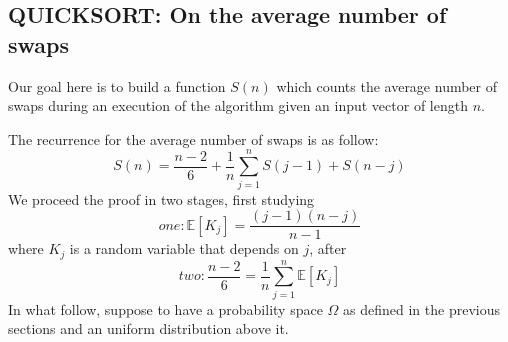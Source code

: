 \subsection{QUICKSORT: On the average number of swaps}
Our goal here is to build a function $S(n)$ which counts the average
number of swaps during an execution of the algorithm given an input
vector of length $n$.

The recurrence for the average number of swaps is as follow:
\begin{displaymath}
  S(n) =  \frac{n-2}{6} +  \frac{1}{n} \sum_{j=1}^{n}{S(j-1) + S(n-j)} 
\end{displaymath}
We proceed the proof in two stages, first studying
\begin{displaymath}
  one: \mathbb{E} \left[K_j \right]  = \frac{(j-1)(n-j)}{n-1} 
\end{displaymath}
where $K_j$ is a random variable that depends on $j$, after
\begin{displaymath}
  two: \frac{n-2}{6} = \frac{1}{n}\sum_{j=1}^{n}{
    \mathbb{E} \left[K_j \right] }
\end{displaymath}
In what follow, suppose to have a probability space $\Omega$ as
defined in the previous sections and an uniform distribution above it.
